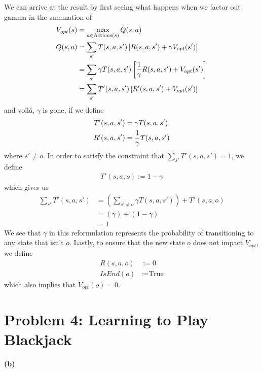 \documentclass[11pt]{article}
\begin{document}
We can arrive at the result by first seeing what happens when we factor out gamma in the summation of
\begin{align}
	V_{opt}(s)
		&= \max_{a \in \text{Actions}(s)} Q(s, a) \\
	Q(s, a)	
		&= \sum_{s'} T(s, a, s') \left[
			R(s, a, s') + \gamma V_{opt}(s')
		\right] \\
		&= \sum_{s'} \gamma T(s, a, s') \left[
			\frac{1}{\gamma} R(s, a, s') + V_{opt}(s')
		\right] \\
		&= \sum_{s'} T'(s, a, s') \left[ R'(s, a, s') + V_{opt}(s') \right]
\end{align}
and voil\'{a}, $\gamma$ is gone, if we define
\begin{align}
	T'(s, a, s') &= \gamma T(s, a, s') \\
	R'(s, a, s') &= \frac{1}{\gamma} T(s, a, s')
\end{align}
where $s' \ne o$. In order to satisfy the constraint that $\sum_{s'} T'(s, a, s') = 1$, we define
\begin{align}
	T'(s, a, o) := 1 - \gamma 
\end{align}
which gives us 
\begin{align}
	\sum_{s'} T'(s, a, s') 
		&= \left( \sum_{s' \ne o} \gamma T(s, a, s') \right) + T'(s, a, o) \\
		&= (\gamma) + (1 - \gamma) \\
		&= 1
\end{align}
We see that $\gamma$ in this reformulation represents the probability of transitioning to any state that isn't $o$. Lastly, to ensure that the new state $o$ does not impact $V_{opt}$, we define
\begin{align}
	R(s, a, o) &:= 0 \\
	IsEnd(o) &:= \text{True}
\end{align}
which also implies that $V_{opt}(o) = 0$. 








\clearpage
\section*{Problem 4: Learning to Play Blackjack}



\textbf{(b)} 
\end{document}

